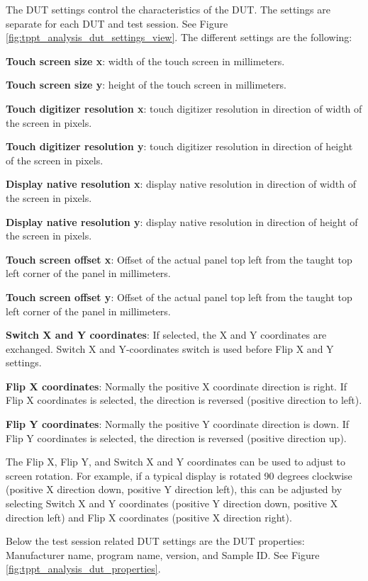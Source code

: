 The DUT settings control the characteristics of the DUT. The settings are separate for each DUT and test session. See Figure \ref{fig:tppt_analysis_dut_settings_view}. The different settings are the following:

\textbf{Touch screen size x}: width of the touch screen in millimeters.

\textbf{Touch screen size y}: height of the touch screen in millimeters.

\textbf{Touch digitizer resolution x}: touch digitizer resolution in direction of width of the screen in pixels.

\textbf{Touch digitizer resolution y}: touch digitizer resolution in direction of height of the screen in pixels.

\textbf{Display native resolution x}: display native resolution in direction of width of the screen in pixels.

\textbf{Display native resolution y}: display native resolution in direction of height of the screen in pixels.

\textbf{Touch screen offset x}: Offset of the actual panel top left from the taught top left corner of the panel in millimeters.

\textbf{Touch screen offset y}: Offset of the actual panel top left from the taught top left corner of the panel in millimeters.

\textbf{Switch X and Y coordinates}: If selected, the X and Y coordinates are exchanged. Switch X and Y-coordinates switch is used before Flip X and Y settings.

\textbf{Flip X coordinates}: Normally the positive X coordinate direction is right. If Flip X coordinates is selected, the direction is reversed (positive direction to left).

\textbf{Flip Y coordinates}: Normally the positive Y coordinate direction is down. If Flip Y coordinates is selected, the direction is reversed (positive direction up).

The Flip X, Flip Y, and Switch X and Y coordinates can be used to adjust to screen rotation. For example, if a typical display is rotated 90 degrees clockwise (positive X direction down, positive Y direction left), this can be adjusted by selecting Switch X and Y coordinates (positive Y direction down, positive X direction left) and Flip X coordinates (positive X direction right).

Below the test session related DUT settings are the DUT properties: Manufacturer name, program name, version, and Sample ID. See Figure \ref{fig:tppt_analysis_dut_properties}.

